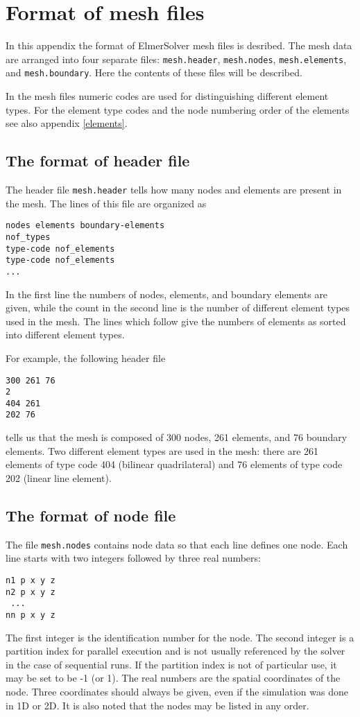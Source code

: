 \chapter{Format of mesh files}
\label{ch:meshformat}

In this appendix the format of ElmerSolver mesh files is desribed.
The mesh data are arranged into four separate files: {\tt mesh.header},
{\tt mesh.nodes}, {\tt mesh.elements}, and {\tt mesh.boundary}.
Here the contents of these files will be described.

In the mesh files numeric codes are used for distinguishing  
different element types. For the element type codes and the node numbering order 
of the elements see also appendix \ref{elements}.


\section{The format of header file}

The header file {\tt mesh.header} tells how many nodes and elements
are present in the mesh. The lines of this file are organized as
\begin{verbatim}
nodes elements boundary-elements
nof_types
type-code nof_elements
type-code nof_elements
...
\end{verbatim}
In the first line the numbers of nodes, elements, and
boundary elements are given, while the count in the second line is
the number of different element types used in the mesh. 
The lines which follow give the numbers of elements 
as sorted into different element types.

For example, the following header file
\begin{verbatim}
300 261 76
2
404 261
202 76
\end{verbatim}
tells us that the mesh is composed of 300 nodes, 261 elements, and 
76 boundary elements. Two different element types are used in the mesh:
there are 261 elements of type code 404 (bilinear quadrilateral) and 
76 elements of type code 202 (linear line element).


\section{The format of node file}

The file {\tt mesh.nodes} contains node data so that each line defines 
one node. Each line starts with two integers followed by three 
real numbers:
\begin{verbatim}
n1 p x y z
n2 p x y z
 ...
nn p x y z
\end{verbatim}
The first integer is the identification number for the node.
The second integer is a partition index for parallel execution and is 
not usually referenced by the solver in the case of sequential runs. If 
the partition index is not of particular use, it may be set to be
-1 (or 1). The real numbers are the spatial coordinates of the
node. Three coordinates should always be given, even if
the simulation was done in 1D or 2D. It 
is also noted that the nodes may be listed in any order.

